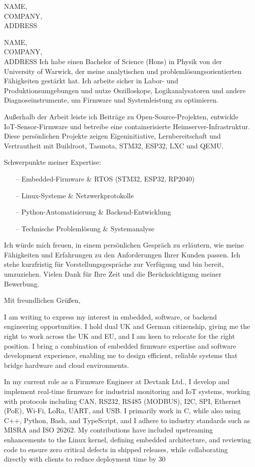 \documentclass[10.5pt]{letter}
\begin{document}
\begin{letter}{NAME,
    \\ COMPANY,
    \\ ADDRESS
}
\begin{letter}{NAME,
    \\ COMPANY,
    \\ ADDRESS
}
Ich habe einen Bachelor of Science (Hons) in Physik von der University of Warwick, der meine analytischen und problemlösungsorientierten Fähigkeiten gestärkt hat. Ich arbeite sicher in Labor- und Produktionsumgebungen und nutze Oszilloskope, Logikanalysatoren und andere Diagnoseinstrumente, um Firmware und Systemleistung zu optimieren.

Außerhalb der Arbeit leiste ich Beiträge zu Open-Source-Projekten, entwickle IoT-Sensor-Firmware und betreibe eine containerisierte Heimserver-Infrastruktur. Diese persönlichen Projekte zeigen Eigeninitiative, Lernbereitschaft und Vertrautheit mit Buildroot, Tasmota, STM32, ESP32, LXC und QEMU.

\noindent
Schwerpunkte meiner Expertise:
\begin{itemize}[topsep=0pt, partopsep=0pt, parsep=0pt, itemsep=2pt]
    \item[--] Embedded-Firmware \& RTOS (STM32, ESP32, RP2040)
    \item[--] Linux-Systeme \& Netzwerkprotokolle
    \item[--] Python-Automatisierung \& Backend-Entwicklung
    \item[--] Technische Problemlösung \& Systemanalyse
\end{itemize}

\noindent

Ich würde mich freuen, in einem persönlichen Gespräch zu erläutern, wie meine Fähigkeiten und Erfahrungen zu den Anforderungen Ihrer Kunden passen. Ich stehe kurzfristig für Vorstellungsgespräche zur Verfügung und bin bereit, umzuziehen. Vielen Dank für Ihre Zeit und die Berücksichtigung meiner Bewerbung.

Mit freundlichen Grüßen,
\else

I am writing to express my interest in embedded, software, or backend engineering opportunities. I hold dual UK and German citizenship, giving me the right to work across the UK and EU, and I am keen to relocate for the right position. I bring a combination of embedded firmware expertise and software development experience, enabling me to design efficient, reliable systems that bridge hardware and cloud environments.

In my current role as a Firmware Engineer at Devtank Ltd., I develop and implement real-time firmware for industrial monitoring and IoT systems, working with protocols including CAN, RS232, RS485 (MODBUS), I2C, SPI, Ethernet (PoE), Wi-Fi, LoRa, UART, and USB. I primarily work in C, while also using C++, Python, Bash, and TypeScript, and I adhere to industry standards such as MISRA and ISO 26262. My contributions have included upstreaming enhancements to the Linux kernel, defining embedded architecture, and reviewing code to ensure zero critical defects in shipped releases, while collaborating directly with clients to reduce deployment time by 30%


\end{letter}
\end{letter}
\end{document}
